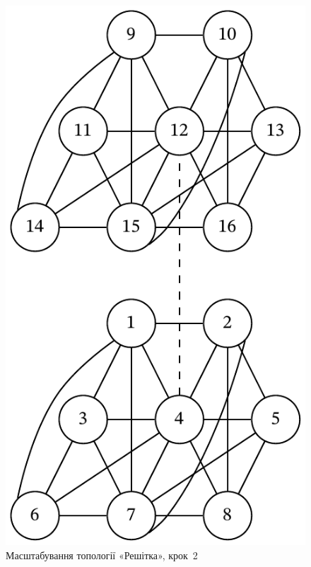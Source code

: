 \documentclass[
	a4paper,
	oneside,
	BCOR = 10mm,
	DIV = 12,
	12pt,
	headings = normal,
]{scrartcl}
\begin{document}
				\begin{figure}[!htbp]
					\centering
					\includegraphics[height=12\baselineskip]{./assets/cluster-08-05-grid-s02.pdf}
					\caption{Масштабування топології «Решітка», крок~2}
					\label{fig:cluster-08-05-grid-s02}
				\end{figure}
\end{document}
